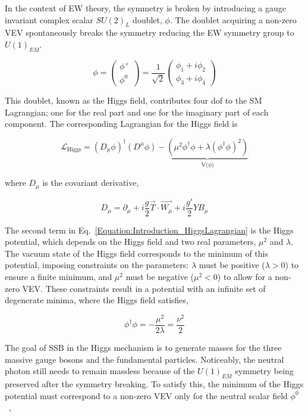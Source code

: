 In the context of EW theory, the symmetry is broken by introducing a gauge invariant complex scalar $SU(2)_{L}$ doublet, $\phi$. The doublet acquiring a non-zero \ac{VEV} spontaneously breaks the symmetry reducing the EW symmetry group to $U(1)_{EM}$.

\[
\phi =
\begin{pmatrix}
\phi^{+} \\
\phi^{0} 
\end{pmatrix}
= \frac{1}{\sqrt{2}} \begin{pmatrix}
    \phi_{1} + i\phi_{2} \\
    \phi_{3} + i\phi_{4}
\end{pmatrix}
\]

This doublet, known as the Higgs field, contributes four \ac{dof} to the SM Lagrangian; one for the real part and one for the imaginary part of each component. The corresponding Lagrangian for the Higgs field is

\begin{equation}
    \mathcal{L}_{\text{Higgs}} = (D_{\mu} \phi)^{\dagger}(D^{\mu}\phi) - \underbrace{(\mu^{2}\phi^{\dagger}\phi + \lambda(\phi^{\dagger}\phi)^2)}_{\text{V($\phi$)}}
\label{Equation:Introduction_HiggsLagrangian}
\end{equation}

where $D_{\mu}$ is the covariant derivative,

\begin{equation}
    D_{\mu} = \partial_{\mu} + i\frac{g}{2}\vec{T}\cdot\vec{W_{\mu}} + i\frac{g'}{2}YB_{\mu}
\end{equation}

The second term in Eq.~\ref{Equation:Introduction_HiggsLagrangian} is the Higgs potential, which depends on the Higgs field and two real parameters, $\mu^{2}$ and $\lambda$. The vacuum state of the Higgs field corresponds to the minimum of this potential, imposing constraints on the parameters: $\lambda$ must be positive ($\lambda > 0$) to ensure a finite minimum, and $\mu^{2}$ must be negative ($\mu^{2} < 0$) to allow for a non-zero VEV. These constraints result in a potential with an infinite set of degenerate minima, where the Higgs field satisfies,

\begin{equation}
    \phi^{\dagger}\phi = -\frac{\mu^{2}}{2\lambda} = \frac{\nu^2}{2}
\end{equation}

The goal of SSB in the Higgs mechanism is to generate masses for the three massive gauge bosons and the fundamental particles.  Noticeably, the neutral photon still needs to remain massless because of the $U(1)_{EM}$ symmetry being preserved after the symmetry breaking. To satisfy this, the minimum of the Higgs potential must correspond to a non-zero VEV only for the neutral scalar field $\phi^{0}$~\cite{Higgs_VacuumState_Choice},

